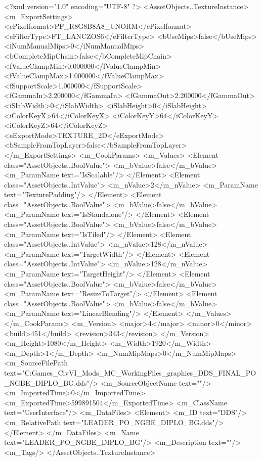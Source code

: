 <?xml version="1.0" encoding="UTF-8" ?>
<AssetObjects..TextureInstance>
	<m_ExportSettings>
		<ePixelformat>PF_R8G8B8A8_UNORM</ePixelformat>
		<eFilterType>FT_LANCZOS6</eFilterType>
		<bUseMips>false</bUseMips>
		<iNumManualMips>0</iNumManualMips>
		<bCompleteMipChain>false</bCompleteMipChain>
		<fValueClampMin>0.000000</fValueClampMin>
		<fValueClampMax>1.000000</fValueClampMax>
		<fSupportScale>1.000000</fSupportScale>
		<fGammaIn>2.200000</fGammaIn>
		<fGammaOut>2.200000</fGammaOut>
		<iSlabWidth>0</iSlabWidth>
		<iSlabHeight>0</iSlabHeight>
		<iColorKeyX>64</iColorKeyX>
		<iColorKeyY>64</iColorKeyY>
		<iColorKeyZ>64</iColorKeyZ>
		<eExportMode>TEXTURE_2D</eExportMode>
		<bSampleFromTopLayer>false</bSampleFromTopLayer>
	</m_ExportSettings>
	<m_CookParams>
		<m_Values>
			<Element class="AssetObjects..BoolValue">
				<m_bValue>false</m_bValue>
				<m_ParamName text="IsScalable"/>
			</Element>
			<Element class="AssetObjects..IntValue">
				<m_nValue>2</m_nValue>
				<m_ParamName text="TexturePadding"/>
			</Element>
			<Element class="AssetObjects..BoolValue">
				<m_bValue>false</m_bValue>
				<m_ParamName text="IsStandalone"/>
			</Element>
			<Element class="AssetObjects..BoolValue">
				<m_bValue>false</m_bValue>
				<m_ParamName text="IsTiled"/>
			</Element>
			<Element class="AssetObjects..IntValue">
				<m_nValue>128</m_nValue>
				<m_ParamName text="TargetWidth"/>
			</Element>
			<Element class="AssetObjects..IntValue">
				<m_nValue>128</m_nValue>
				<m_ParamName text="TargetHeight"/>
			</Element>
			<Element class="AssetObjects..BoolValue">
				<m_bValue>false</m_bValue>
				<m_ParamName text="ResizeToTarget"/>
			</Element>
			<Element class="AssetObjects..BoolValue">
				<m_bValue>false</m_bValue>
				<m_ParamName text="LinearBlending"/>
			</Element>
		</m_Values>
	</m_CookParams>
	<m_Version>
		<major>4</major>
		<minor>0</minor>
		<build>451</build>
		<revision>343</revision>
	</m_Version>
	<m_Height>1080</m_Height>
	<m_Width>1920</m_Width>
	<m_Depth>1</m_Depth>
	<m_NumMipMaps>0</m_NumMipMaps>
	<m_SourceFilePath text="C:\Users\Matt\Documents\My Games\MC_CivVI_Mods\_MC_WorkingFiles\_graphics\_DDS_FINAL\LEADER_PO_NGBE_DIPLO_BG.dds"/>
	<m_SourceObjectName text=""/>
	<m_ImportedTime>0</m_ImportedTime>
	<m_ExportedTime>599891504</m_ExportedTime>
	<m_ClassName text="UserInterface"/>
	<m_DataFiles>
		<Element>
			<m_ID text="DDS"/>
			<m_RelativePath text="LEADER_PO_NGBE_DIPLO_BG.dds"/>
		</Element>
	</m_DataFiles>
	<m_Name text="LEADER_PO_NGBE_DIPLO_BG"/>
	<m_Description text=""/>
	<m_Tags/>
</AssetObjects..TextureInstance>

